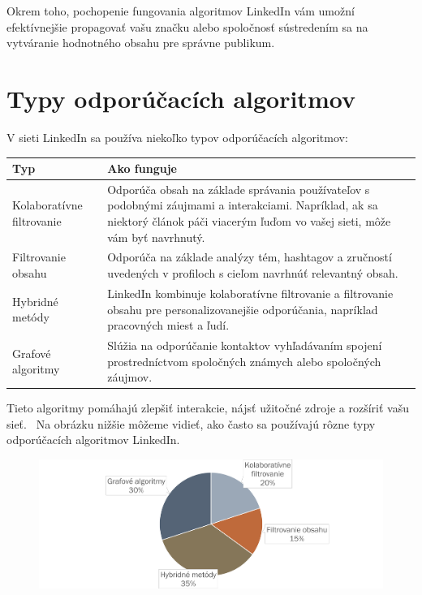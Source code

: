 \documentclass[slovak,a4paper]{coursepaper}
\begin{document}
Okrem toho, pochopenie fungovania algoritmov LinkedIn vám umožní efektívnejšie propagovať vašu značku alebo spoločnosť sústredením sa na vytváranie hodnotného obsahu pre správne publikum.~\cite{3}

\newpage
\section{Typy odporúčacích algoritmov} \label{Typy}
V sieti LinkedIn sa používa niekoľko typov odporúčacích algoritmov:


\begin{table}[h!]
    \begin{tabularx}{\textwidth}{|>{\centering\arraybackslash}l|X|}
        \hline
        \textbf{Typ} & \textbf{Ako funguje} 
		\\ \hline Kolaboratívne filtrovanie & Odporúča obsah na základe správania používateľov 
		s podobnými záujmami a interakciami. Napríklad, ak sa niektorý článok páči viacerým ľuďom vo vašej sieti, môže vám byť navrhnutý.

		\\ \hline Filtrovanie obsahu & Odporúča na základe analýzy tém, hashtagov a zručností uvedených v profiloch s cieľom navrhnúť relevantný obsah.  
		\\ \hline Hybridné metódy & LinkedIn kombinuje kolaboratívne filtrovanie a filtrovanie obsahu pre personalizovanejšie odporúčania, napríklad pracovných miest a ľudí.
		\\ \hline Grafové algoritmy & Slúžia na odporúčanie kontaktov vyhľadávaním spojení prostredníctvom spoločných známych alebo spoločných záujmov.
		\\ \hline
    \end{tabularx}
    \label{tab:typy}
\end{table}

Tieto algoritmy pomáhajú zlepšiť interakcie, nájsť užitočné zdroje a rozšíriť vašu sieť.~\cite{4} Na obrázku nižšie môžeme vidieť, ako často sa používajú rôzne typy odporúčacích algoritmov LinkedIn.

\begin{figure}[H]
	\hspace*{-3cm}
	\includegraphics[width=1.4\textwidth]{graph.png}
\end{figure}
\end{document}

